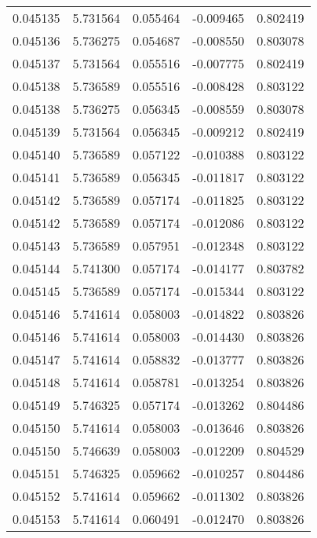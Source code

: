 \begin{tabular}{lrrrr}
0.045135    &  5.731564 &  0.055464 & -0.009465 &             0.802419 \\
0.045136    &  5.736275 &  0.054687 & -0.008550 &             0.803078 \\
0.045137    &  5.731564 &  0.055516 & -0.007775 &             0.802419 \\
0.045138    &  5.736589 &  0.055516 & -0.008428 &             0.803122 \\
0.045138    &  5.736275 &  0.056345 & -0.008559 &             0.803078 \\
0.045139    &  5.731564 &  0.056345 & -0.009212 &             0.802419 \\
0.045140    &  5.736589 &  0.057122 & -0.010388 &             0.803122 \\
0.045141    &  5.736589 &  0.056345 & -0.011817 &             0.803122 \\
0.045142    &  5.736589 &  0.057174 & -0.011825 &             0.803122 \\
0.045142    &  5.736589 &  0.057174 & -0.012086 &             0.803122 \\
0.045143    &  5.736589 &  0.057951 & -0.012348 &             0.803122 \\
0.045144    &  5.741300 &  0.057174 & -0.014177 &             0.803782 \\
0.045145    &  5.736589 &  0.057174 & -0.015344 &             0.803122 \\
0.045146    &  5.741614 &  0.058003 & -0.014822 &             0.803826 \\
0.045146    &  5.741614 &  0.058003 & -0.014430 &             0.803826 \\
0.045147    &  5.741614 &  0.058832 & -0.013777 &             0.803826 \\
0.045148    &  5.741614 &  0.058781 & -0.013254 &             0.803826 \\
0.045149    &  5.746325 &  0.057174 & -0.013262 &             0.804486 \\
0.045150    &  5.741614 &  0.058003 & -0.013646 &             0.803826 \\
0.045150    &  5.746639 &  0.058003 & -0.012209 &             0.804529 \\
0.045151    &  5.746325 &  0.059662 & -0.010257 &             0.804486 \\
0.045152    &  5.741614 &  0.059662 & -0.011302 &             0.803826 \\
0.045153    &  5.741614 &  0.060491 & -0.012470 &             0.803826 \\

\end{tabular}
